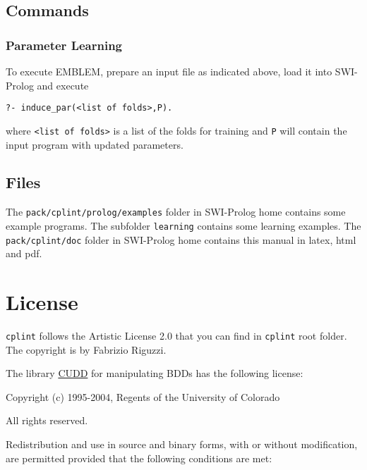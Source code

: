 \documentclass[a4paper,10pt]{scrartcl}
\begin{document}










\subsection{Commands}
\subsubsection{Parameter Learning}
To execute EMBLEM, prepare an input file as indicated above,
 load it into SWI-Prolog and execute
\begin{verbatim}
?- induce_par(<list of folds>,P).
\end{verbatim}
where \verb|<list of folds>| is a list of the folds for training and
\verb|P| will contain the input program with updated parameters.





\subsection{Files}
The \texttt{pack/cplint/prolog/examples} folder in SWI-Prolog home contains some example programs. The subfolder \texttt{learning} contains some learning examples.
The \texttt{pack/cplint/doc} folder in SWI-Prolog home contains this manual in latex, html and pdf.


\section{License}
\label{license}



\texttt{cplint} follows the Artistic License 2.0 that you can find in \texttt{cplint} root folder. The copyright is by Fabrizio Riguzzi.
\vspace{3mm}


The library \href{http://vlsi.colorado.edu/\string ~fabio/}{CUDD} for manipulating BDDs has the following license:

\vspace{3mm}

Copyright (c) 1995-2004, Regents of the University of Colorado

All rights reserved.

Redistribution and use in source and binary forms, with or without
modification, are permitted provided that the following conditions
are met:
\end{document}
